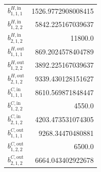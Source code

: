 \documentclass{article}%
\begin{document}
\begin{multicols*}{3}
\begin{supertabular}{lr}
	$b_{1,1,1}^{H,\text{in}}$ & 1526.9772908008415 \\%
	$b_{1,2,2}^{H,\text{in}}$ & 5842.225167039637 \\%
	$b_{2,1,2}^{H,\text{in}}$ & 11800.0 \\%
	$b_{1,1,1}^{H,\text{out}}$ & 869.2024578404789 \\%
	$b_{1,2,2}^{H,\text{out}}$ & 3892.225167039637 \\%
	$b_{2,1,2}^{H,\text{out}}$ & 9339.430128151627 \\%
	$b_{1,1,1}^{C,\text{in}}$ & 8610.569871848447 \\%
	$b_{1,2,2}^{C,\text{in}}$ & 4550.0 \\%
	$b_{2,1,2}^{C,\text{in}}$ & 4203.473531074305 \\%
	$b_{1,1,1}^{C,\text{out}}$ & 9268.34470480881 \\%
	$b_{1,2,2}^{C,\text{out}}$ & 6500.0 \\%
	$b_{2,1,2}^{C,\text{out}}$ & 6664.043402922678 \\%
\end{supertabular}%
\end{multicols*}%
\clearpage%
\end{document}
